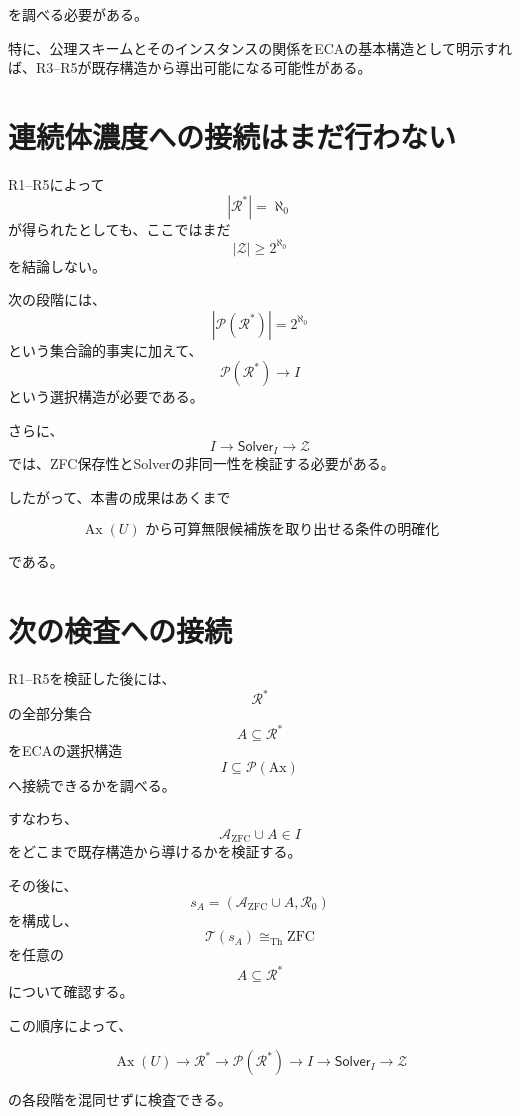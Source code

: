 \documentclass[a4paper,11pt]{ltjsarticle}
\newcommand{\Ax}{\mathrm{Ax}}
\newcommand{\Solver}{\mathsf{Solver}}
\newcommand{\ZFC}{\mathrm{ZFC}}
\begin{document}
を調べる必要がある。

特に、公理スキームとそのインスタンスの関係をECAの基本構造として明示すれば、R3--R5が既存構造から導出可能になる可能性がある。

\section{連続体濃度への接続はまだ行わない}

R1--R5によって
\[
|\mathcal R^*|=\aleph_0
\]
が得られたとしても、ここではまだ
\[
|\mathcal Z|\ge2^{\aleph_0}
\]
を結論しない。

次の段階には、
\[
|\mathcal P(\mathcal R^*)|
=
2^{\aleph_0}
\]
という集合論的事実に加えて、
\[
\mathcal P(\mathcal R^*)\to I
\]
という選択構造が必要である。

さらに、
\[
I\to\Solver_I\to\mathcal Z
\]
では、ZFC保存性とSolverの非同一性を検証する必要がある。

したがって、本書の成果はあくまで

\[
\boxed{
\operatorname{Ax}(U)
\text{ から可算無限候補族を取り出せる条件の明確化}
}
\]

である。

\section{次の検査への接続}

R1--R5を検証した後には、
\[
\mathcal R^*
\]
の全部分集合
\[
A\subseteq\mathcal R^*
\]
をECAの選択構造
\[
I\subseteq\mathcal P(\Ax)
\]
へ接続できるかを調べる。

すなわち、
\[
\mathcal A_{\mathrm{ZFC}}\cup A\in I
\]
をどこまで既存構造から導けるかを検証する。

その後に、
\[
s_A
=
(\mathcal A_{\mathrm{ZFC}}\cup A,\mathcal R_0)
\]
を構成し、
\[
\mathcal T(s_A)\cong_{\mathrm{Th}}\ZFC
\]
を任意の
\[
A\subseteq\mathcal R^*
\]
について確認する。

この順序によって、

\[
\boxed{
\operatorname{Ax}(U)
\to
\mathcal R^*
\to
\mathcal P(\mathcal R^*)
\to
I
\to
\Solver_I
\to
\mathcal Z
}
\]

の各段階を混同せずに検査できる。
\end{document}
